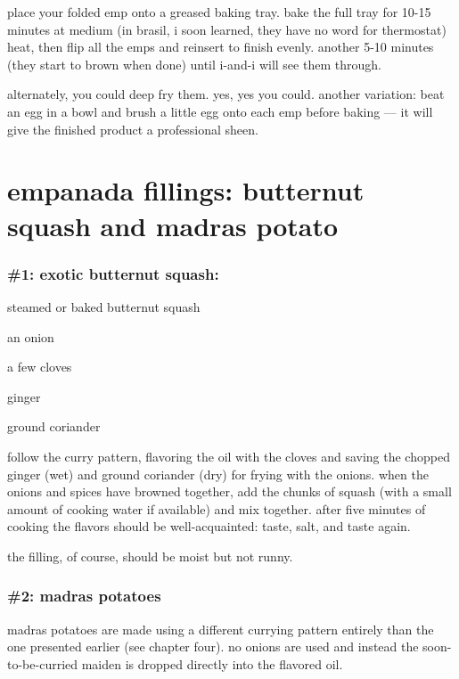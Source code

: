 place your folded emp onto a greased baking tray. bake the full tray
for 10-15 minutes at medium (in brasil, i soon learned, they have no
word for thermostat) heat, then flip all the emps and reinsert to
finish evenly. another 5-10 minutes (they start to brown when done)
until i-and-i will see them through.

alternately, you could deep fry them. yes, yes you could. another
variation: beat an egg in a bowl and brush a little egg onto each emp
before baking --- it will give the finished product a professional
sheen.

\section{empanada fillings: butternut squash and madras potato}

\subsubsection{\#1: exotic butternut squash:}

\begin{ingredients}
  \item steamed or baked butternut squash
  \item an onion
  \item a few cloves
  \item ginger
  \item ground coriander
\end{ingredients}

follow the curry pattern, flavoring the oil with the cloves and saving
the chopped ginger (wet) and ground coriander (dry) for frying with
the onions. when the onions and spices have browned together, add the
chunks of squash (with a small amount of cooking water if available)
and mix together. after five minutes of cooking the flavors should be
well-acquainted: taste, salt, and taste again.

the filling, of course, should be moist but not runny.

\subsubsection{\#2: madras potatoes}

madras potatoes are made using a different currying pattern entirely
than the one presented earlier (see chapter four). no onions are used
and instead the soon-to-be-curried maiden is dropped directly into the
flavored oil.

